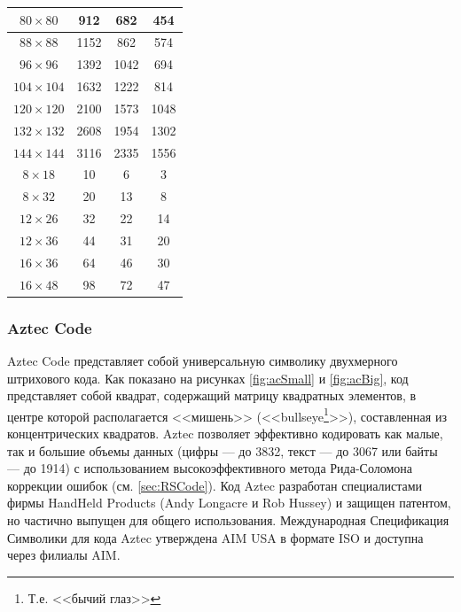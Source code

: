 \begin{table}[htb]
\begin{tabular}{|c|c|c|c|}
    \hline 
    $80 \times 80$ & 912 & 682 & 454 \\
    
    \hline 
    $88 \times 88$ & 1152 & 862 & 574 \\
    
    \hline 
    $96 \times 96$ & 1392 & 1042 & 694 \\
    
    \hline 
    $104 \times 104$ & 1632 & 1222 & 814 \\
    
    \hline 
    $120 \times 120$ & 2100 & 1573 & 1048 \\
    
    \hline 
    $132 \times 132$ & 2608 & 1954 & 1302 \\
    
    \hline 
    $144 \times 144$ & 3116 & 2335 & 1556 \\    
     
    \hline 
    \hline
    $8 \times 18$ & 10 & 6 & 3 \\
    
    \hline
    $8 \times 32$ & 20 & 13 & 8 \\
    
    \hline
    $12 \times 26$ & 32 & 22 & 14 \\
    
    \hline
    $12 \times 36$ & 44 & 31 & 20 \\
    
    \hline
    $16 \times 36$ & 64 & 46 & 30 \\
    
    \hline
    $16 \times 48$ & 98 & 72 & 47 \\
    
    \hline
\end{tabular} 
\end{table}
 

\subsubsection{Aztec Code}

Aztec Code представляет собой универсальную символику двухмерного
штрихового кода. Как показано на рисунках \ref{fig:acSmall} и \ref{fig:acBig},
код представляет собой квадрат, 
содержащий матрицу квадратных элементов, в центре которой располагается 
<<мишень>> (<<bullseye\footnote{Т.е. <<бычий глаз>> }>>), 
составленная из концентрических квадратов. Aztec 
позволяет эффективно кодировать как малые, так и большие объемы данных 
(цифры --- до 3832, текст --- до 3067 или байты --- до 1914) с 
использованием высокоэффективного метода Рида-Соломона коррекции ошибок 
(см. \ref{sec:RSCode}). Код Aztec разработан специалистами фирмы 
HandHeld Products (Andy Longacre и Rob Hussey) и защищен патентом, но частично 
выпущен для общего использования. Международная Спецификация Символики для 
кода Aztec утверждена AIM USA в формате ISO и доступна через филиалы AIM.



